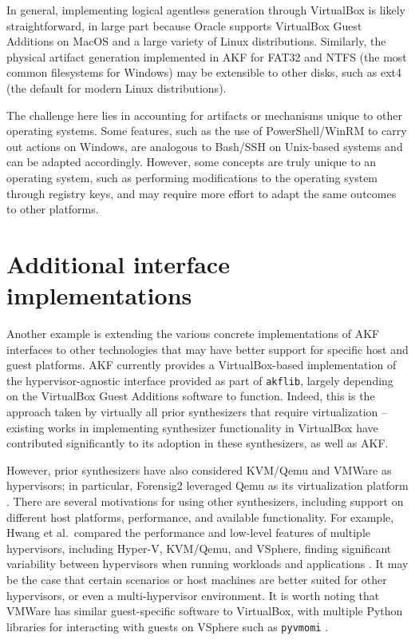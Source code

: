 \documentclass[letterpaper,12pt]{report}
\newcommand{\passthrough}[1]{#1}
\begin{document}
In general, implementing logical agentless generation through VirtualBox
is likely straightforward, in large part because Oracle supports
VirtualBox Guest Additions on MacOS and a large variety of Linux
distributions. Similarly, the physical artifact generation implemented
in AKF for FAT32 and NTFS (the most common filesystems for Windows) may
be extensible to other disks, such as ext4 (the default for modern Linux
distributions).

The challenge here lies in accounting for artifacts or mechanisms unique
to other operating systems. Some features, such as the use of
PowerShell/WinRM to carry out actions on Windows, are analogous to
Bash/SSH on Unix-based systems and can be adapted accordingly. However,
some concepts are truly unique to an operating system, such as
performing modifications to the operating system through registry keys,
and may require more effort to adapt the same outcomes to other
platforms.

\section{Additional interface
implementations}\label{additional-interface-implementations}

Another example is extending the various concrete implementations of AKF
interfaces to other technologies that may have better support for
specific host and guest platforms. AKF currently provides a
VirtualBox-based implementation of the hypervisor-agnostic interface
provided as part of \passthrough{\lstinline!akflib!}, largely depending
on the VirtualBox Guest Additions software to function. Indeed, this is
the approach taken by virtually all prior synthesizers that require
virtualization -- existing works in implementing synthesizer
functionality in VirtualBox have contributed significantly to its
adoption in these synthesizers, as well as AKF.

However, prior synthesizers have also considered KVM/Qemu and VMWare as
hypervisors; in particular, Forensig2 leveraged Qemu as its
virtualization platform \cite{mochForensicImageGenerator2009}. There
are several motivations for using other synthesizers, including support
on different host platforms, performance, and available functionality.
For example, Hwang et al.~compared the performance and low-level
features of multiple hypervisors, including Hyper-V, KVM/Qemu, and
VSphere, finding significant variability between hypervisors when
running workloads and applications
\cite{hwangComponentbasedPerformanceComparison2013}. It may be the
case that certain scenarios or host machines are better suited for other
hypervisors, or even a multi-hypervisor environment. It is worth noting
that VMWare has similar guest-specific software to VirtualBox, with
multiple Python libraries for interacting with guests on VSphere such as
\passthrough{\lstinline!pyvmomi!} \cite{VmwarePyvmomi2025}.
\end{document}
